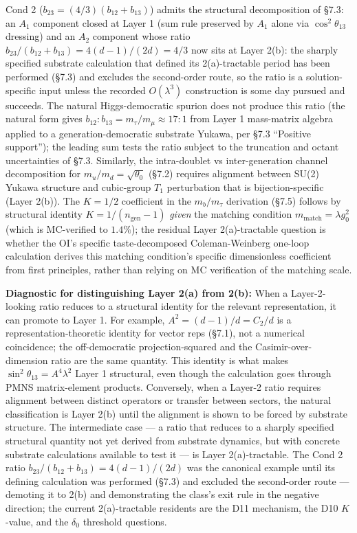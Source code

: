 \documentclass[
]{article}
\begin{document}
Cond 2 (\(b_{23} = (4/3)(b_{12}+b_{13})\)) admits the structural
decomposition of §7.3: an \(A_1\) component closed at Layer 1 (sum rule
preserved by \(A_1\) alone via \(\cos^2\theta_{13}\) dressing) and an
\(A_2\) component whose ratio
\(b_{23}/(b_{12}+b_{13}) = 4(d-1)/(2d) = 4/3\) now sits at Layer 2(b):
the sharply specified substrate calculation that defined its
2(a)-tractable period has been performed (§7.3) and excludes the
second-order route, so the ratio is a solution-specific input unless the
recorded \(O(\lambda^3)\) construction is some day pursued and succeeds.
The natural Higgs-democratic spurion does not produce this ratio (the
natural form gives \(b_{12}:b_{13} = m_\tau/m_\mu \approx 17 : 1\) from
Layer 1 mass-matrix algebra applied to a generation-democratic substrate
Yukawa, per §7.3 ``Positive support''); the leading sum tests the ratio
subject to the truncation and octant uncertainties of §7.3. Similarly,
the intra-doublet vs inter-generation channel decomposition for
\(m_u/m_d = \sqrt{\theta_0}\) (§7.2) requires alignment between SU(2)
Yukawa structure and cubic-group \(T_1\) perturbation that is
bijection-specific (Layer 2(b)). The \(K = 1/2\) coefficient in the
\(m_b/m_\tau\) derivation (§7.5) follows by structural identity
\(K = 1/(n_{\text{gen}} - 1)\) \emph{given} the matching condition
\(m_{\text{match}} = \lambda g_0^2\) (which is MC-verified to
\(1.4\%\)); the residual Layer 2(a)-tractable question is whether the
OI's specific taste-decomposed Coleman-Weinberg one-loop calculation
derives this matching condition's specific dimensionless coefficient
from first principles, rather than relying on MC verification of the
matching scale.

\textbf{Diagnostic for distinguishing Layer 2(a) from 2(b):} When a
Layer-2-looking ratio reduces to a structural identity for the relevant
representation, it can promote to Layer 1. For example,
\(A^2 = (d-1)/d = C_2/d\) is a representation-theoretic identity for
vector reps (§7.1), not a numerical coincidence; the off-democratic
projection-squared and the Casimir-over-dimension ratio are the same
quantity. This identity is what makes
\(\sin^2\theta_{13} = A^4\lambda^2\) Layer 1 structural, even though the
calculation goes through PMNS matrix-element products. Conversely, when
a Layer-2 ratio requires alignment between distinct operators or
transfer between sectors, the natural classification is Layer 2(b) until
the alignment is shown to be forced by substrate structure. The
intermediate case --- a ratio that reduces to a sharply specified
structural quantity not yet derived from substrate dynamics, but with
concrete substrate calculations available to test it --- is Layer
2(a)-tractable. The Cond 2 ratio
\(b_{23}/(b_{12}+b_{13}) = 4(d-1)/(2d)\) was the canonical example until
its defining calculation was performed (§7.3) and excluded the
second-order route --- demoting it to 2(b) and demonstrating the class's
exit rule in the negative direction; the current 2(a)-tractable
residents are the D11 mechanism, the D10 \(K\)-value, and the
\(\delta_0\) threshold questions.
\end{document}
